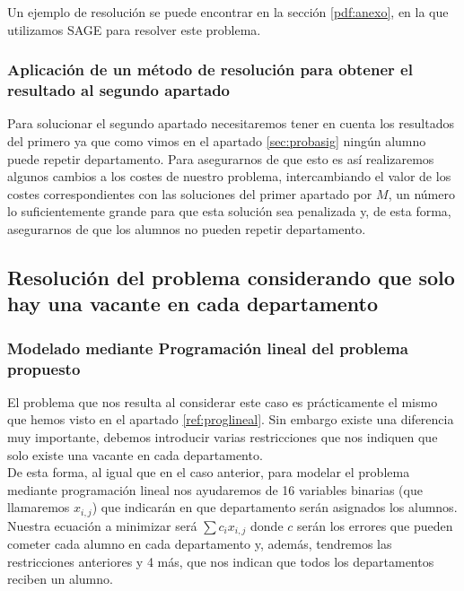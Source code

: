 \documentclass[11pt]{article}
\begin{document}
Un ejemplo de resolución se puede encontrar en la sección \ref{pdf:anexo}, en la que utilizamos SAGE para resolver este problema. \label{ref:modo1SAGE}

\subsubsection{Aplicación de un método de resolución para obtener el resultado al segundo apartado}
Para solucionar el segundo apartado necesitaremos tener en cuenta los resultados del primero ya que como vimos en el apartado \ref{sec:probasig} ningún alumno puede repetir departamento. Para asegurarnos de que esto es así realizaremos algunos cambios a los costes de nuestro problema, intercambiando el valor de los costes correspondientes con las soluciones del primer apartado por $M$, un número lo suficientemente grande para que esta solución sea penalizada y, de esta forma, asegurarnos de que los alumnos no pueden repetir departamento.







\subsection{Resolución del problema considerando que solo hay una vacante en cada departamento}
\subsubsection{Modelado mediante Programación lineal del problema propuesto}

El problema que nos resulta al considerar este caso es prácticamente el mismo que hemos visto en el apartado \ref{ref:proglineal}. 
Sin embargo existe una diferencia muy importante, debemos introducir varias restricciones que nos indiquen que solo existe una vacante en cada departamento.\\

De esta forma, al igual que en el caso anterior, para modelar el problema mediante programación lineal nos ayudaremos de 16 variables binarias (que llamaremos $x_{i,j}$) que indicarán en que departamento serán asignados los alumnos.\\


Nuestra ecuación a minimizar será $\sum{c_i x_{i,j}}$ donde $c$ serán los errores que pueden cometer cada alumno en cada departamento y, además, tendremos las restricciones anteriores y 4 más, que nos indican que todos los departamentos reciben un alumno.
\end{document}
